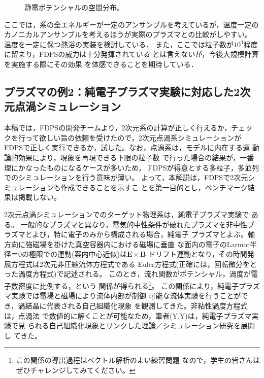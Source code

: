 \documentclass{jspf}            %
\renewcommand{\vec}[1]{\bm{#1}}
\begin{document}
\begin{figure}[h]
\begin{center}
\caption{静電ポテンシャルの空間分布。}
\label{numata02}
\end{center}
\end{figure}
ここでは，系の全エネルギーが一定のアンサンブルを考えているが，温度一定の
カノニカルアンサンブルを考えるほうが実際のプラズマとの比較がしやすい。
温度を一定に保つ熱浴の実装を検討している．
また，ここでは粒子数が$10^4$程度に留まり，FDPSの威力は十分発揮されている
とは言えないが，今後大規模計算を実施する際にその効果
を体感できることを期待している．

\subsection{プラズマの例2：純電子プラズマ実験に対応した2次元点渦シミュレーション}
本稿では，FDPSの開発チームより，2次元系の計算が正しく行えるか，チェッ
クを行って欲しい旨の依頼を受けたので，2次元点渦系シミュレーションが
FDPSで正しく実行できるか，試した。なお，点渦系は，モデルに内在する運
動論的効果により\cite{Yatsuyanagi2015b}，現象を再現できる下限の粒子数
で行った場合の結果が，一番理にかなったものになるケースが多いため，
FDPSが得意とする多粒子，多並列でのシミュレーションを行う意味が薄い。
よって，本解説は，FDPSで2次元シミュレーションも作成できることを示すこ
とを第一目的とし，ベンチマーク結果は掲載しない。

2次元点渦シミュレーションでのターゲット物理系は，純電子プラズマ実験で
ある。
一般的なプラズマと異なり，電気的中性条件が破れたプラズマを非中性プ
ラズマとよび\cite{毛利2001}，特に電子のみから構成される場合，純電子
プラズマとよぶ。軸方向に強磁場を掛けた真空容器内における磁場に垂直
な面内の電子のLarmor半径＝0の極限での運動(案内中心近似)は$\vec{E}\times\vec{B}$
ドリフト運動となり，その時間発展方程式は2次元非圧縮流体方程式である
Euler方程式(正確には，回転微分をとった渦度方程式)で記述される\cite{際本2001-2}。
このとき，流れ関数がポテンシャル，渦度が電子数密度に比例する，という
関係が得られる\footnote{この関係の導出過程はベクトル解析のよい練習問題
なので，学生の皆さんはぜひチャレンジしてみてください。}。
この関係により，純電子プラズマ実験では電場と磁場により流体内部が制御
可能な流体実験を行うことができ，渦結晶に代表される自己組織化現象
を観測してきた\cite{Jin2000,Sanpei}。非粘性渦度方程式は，点渦法
で数値的に解くことが可能なため，筆者(Y.Y)は，純電子プラズマ実験で見
られる自己組織化現象とリンクした理論／シミュレーション研究を展開し
てきた。
\end{document}
